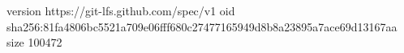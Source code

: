 version https://git-lfs.github.com/spec/v1
oid sha256:81fa4806bc5521a709e06fff680c27477165949d8b8a23895a7ace69d13167aa
size 100472
